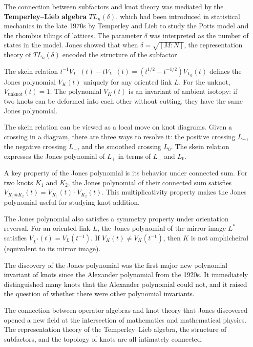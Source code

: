 The connection between subfactors and knot theory was mediated by the \textbf{Temperley--Lieb algebra} $TL_n(\delta)$, which had been introduced in statistical mechanics in the late 1970s by Temperley and Lieb to study the Potts model and the rhombus tilings of lattices. The parameter $\delta$ was interpreted as the number of states in the model. Jones showed that when $\delta = \sqrt{[M:N]}$, the representation theory of $TL_n(\delta)$ encoded the structure of the subfactor.

The skein relation $t^{-1}V_{L_+}(t) - tV_{L_-}(t) = (t^{1/2} - t^{-1/2})V_{L_0}(t)$ defines the Jones polynomial $V_K(t)$ uniquely for any oriented link $L$. For the unknot, $V_{\text{unknot}}(t) = 1$. The polynomial $V_K(t)$ is an invariant of ambient isotopy: if two knots can be deformed into each other without cutting, they have the same Jones polynomial.

The skein relation can be viewed as a local move on knot diagrams. Given a crossing in a diagram, there are three ways to resolve it: the positive crossing $L_+$, the negative crossing $L_-$, and the smoothed crossing $L_0$. The skein relation expresses the Jones polynomial of $L_+$ in terms of $L_-$ and $L_0$.

A key property of the Jones polynomial is its behavior under connected sum. For two knots $K_1$ and $K_2$, the Jones polynomial of their connected sum satisfies $V_{K_1 \# K_2}(t) = V_{K_1}(t) \cdot V_{K_2}(t)$. This multiplicativity property makes the Jones polynomial useful for studying knot addition.

The Jones polynomial also satisfies a symmetry property under orientation reversal. For an oriented link $L$, the Jones polynomial of the mirror image $L^*$ satisfies $V_{L^*}(t) = V_L(t^{-1})$. If $V_K(t) \neq V_K(t^{-1})$, then $K$ is not amphicheiral (equivalent to its mirror image).

The discovery of the Jones polynomial was the first major new polynomial invariant of knots since the Alexander polynomial from the 1920s. It immediately distinguished many knots that the Alexander polynomial could not, and it raised the question of whether there were other polynomial invariants.

The connection between operator algebras and knot theory that Jones discovered opened a new field at the intersection of mathematics and mathematical physics. The representation theory of the Temperley--Lieb algebra, the structure of subfactors, and the topology of knots are all intimately connected.

